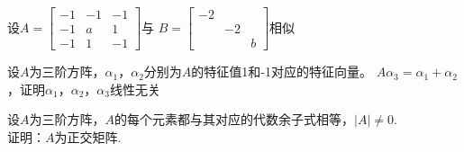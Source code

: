 \documentclass[a4paper]{exam}
\begin{document}
\begin{CJK*}{UTF8}{gbsn}
\begin{questions}
	\vspace{3.5cm}
	
	\question 设$A = \left[ {\begin{array}{*{20}{c}}
		{ - 1}&{ - 1}&{ - 1}\\
		{ - 1}&a&1\\
		{ - 1}&1&{ - 1}
		\end{array}} \right]$与 $B = \left[ {\begin{array}{*{20}{c}}
		{ - 2}&{}&{}\\
		{}&{ - 2}&{}\\
		{}&{}&b
		\end{array}} \right]$相似
	
	\vspace{4cm}
	
	\question 设$A$为三阶方阵，${\alpha _1}$，${\alpha _2}$分别为$A$的特征值1和-1对应的特征向量。 $A\alpha_3=\alpha_1+\alpha_2$，证明${\alpha _1}$，${\alpha _2}$，${\alpha _3}$线性无关
	
	\vspace{4.5cm}
	
	\question 设$A$为三阶方阵，$A$的每个元素都与其对应的代数余子式相等，$\left| A \right| \ne 0$.\\
	证明：$A$为正交矩阵.
	
\end{questions}
\newpage
\end{CJK*}
\end{document}
